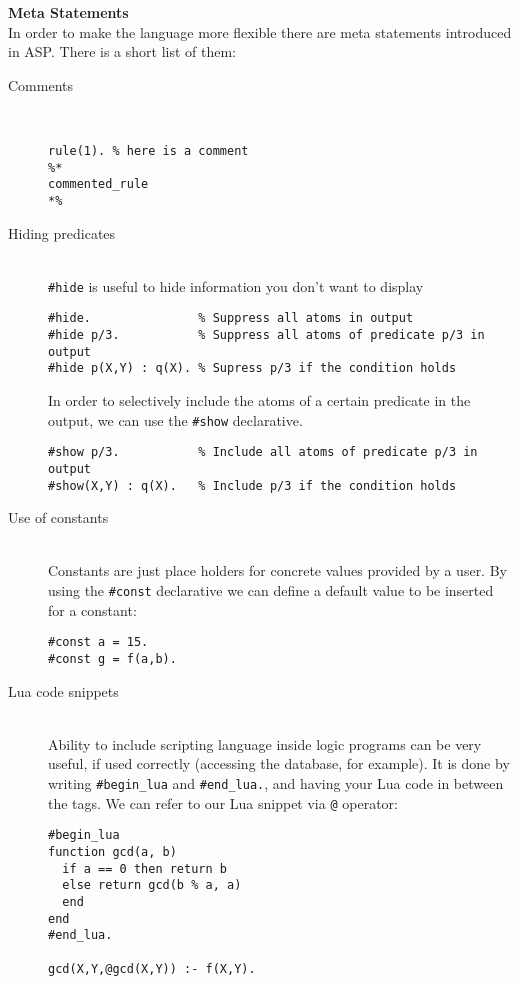 \documentclass[11pt]{article}
\begin{document}
\textbf{Meta Statements}\\
In order to make the language more flexible there are meta statements introduced in ASP. There is a short list of them:
\begin{description}
  \item[Comments] \hfill \\
  \begin{lstlisting}
rule(1). % here is a comment
%*
commented_rule
*%
  \end{lstlisting}
  \item[Hiding predicates] \hfill \\
  \texttt{\#hide} is useful to hide information you don't want to display
  \begin{lstlisting}
#hide.               % Suppress all atoms in output
#hide p/3.           % Suppress all atoms of predicate p/3 in output
#hide p(X,Y) : q(X). % Supress p/3 if the condition holds
  \end{lstlisting}
  In order to selectively include the atoms of a certain predicate in the output, we can use the \texttt{\#show} declarative.
  \begin{lstlisting}
#show p/3.           % Include all atoms of predicate p/3 in output
#show(X,Y) : q(X).   % Include p/3 if the condition holds
  \end{lstlisting}
  \item[Use of constants] \hfill \\
  Constants are just place holders for concrete values provided by a user. 
  By using the \texttt{\#const} declarative we can define a default value to be
inserted for a constant:
   \begin{lstlisting}
#const a = 15.
#const g = f(a,b).
  \end{lstlisting}
  \item[Lua code snippets] \hfill \\
  Ability to include scripting language inside logic programs can be very useful, 
  if used correctly (accessing the database, for example). 
  It is done by writing \texttt{\#begin\_lua} and \texttt{\#end\_lua.}, 
  and having your Lua code in between the tags. We can refer to our Lua snippet via \texttt{@} operator:
     \begin{lstlisting}
#begin_lua
function gcd(a, b)
  if a == 0 then return b
  else return gcd(b % a, a)
  end
end
#end_lua.

gcd(X,Y,@gcd(X,Y)) :- f(X,Y).
  \end{lstlisting}
\end{description}
\end{document}
